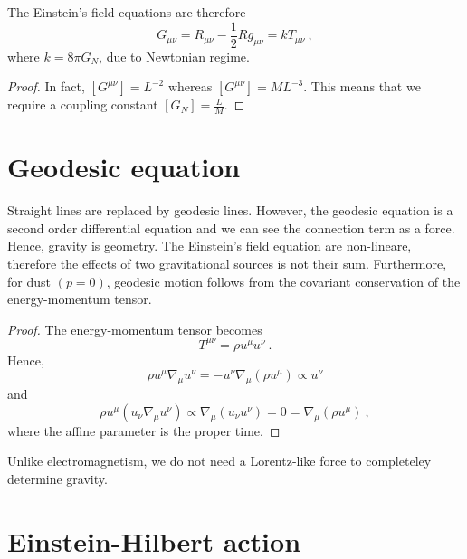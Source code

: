     The Einstein's field equations are therefore
    \begin{equation*}
        G_{\mu\nu} = R_{\mu\nu} - \frac{1}{2} R g_{\mu\nu} = k T_{\mu\nu} ~,
    \end{equation*}
    where $k = 8 \pi G_N$, due to Newtonian regime.
    \begin{proof}
        In fact, $[G^{\mu\nu}] = L^{-2}$ whereas $[G^{\mu\nu}] = M L^{-3}$. This means that we require a coupling constant $[G_N] = \frac{L}{M}$. 
    \end{proof}

\section{Geodesic equation} 

    Straight lines are replaced by geodesic lines. However, the geodesic equation is a second order differential equation and we can see the connection term as a force. Hence, gravity is geometry. The Einstein's field equation are non-lineare, therefore the effects of two gravitational sources is not their sum. Furthermore, for dust $(p = 0)$, geodesic motion follows from the covariant conservation of the energy-momentum tensor. 
    \begin{proof}
        The energy-momentum tensor becomes
        \begin{equation*}
            T^{\mu\nu} = \rho u^\mu u^\nu ~.
        \end{equation*}
        Hence, 
        \begin{equation*}
            \rho u^\mu \nabla_\mu u^\nu = - u^\nu \nabla_\mu (\rho u^\mu ) \propto u^\nu 
        \end{equation*}
        and 
        \begin{equation*}
            \rho u^\mu (u_\nu \nabla_\mu u^\nu) \propto \nabla_\mu (u_\nu u^\nu) = 0 = \nabla_\mu (\rho u^\mu) ~,
        \end{equation*}
        where the affine parameter is the proper time.
    \end{proof}

    Unlike electromagnetism, we do not need a Lorentz-like force to completeley determine gravity. 

\section{Einstein-Hilbert action} 